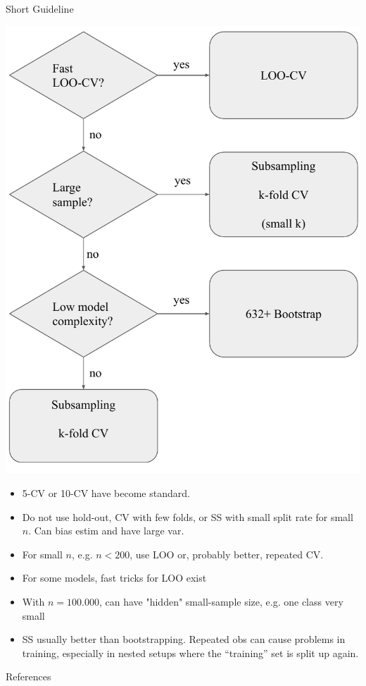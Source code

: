 \begin{vbframe}{Short Guideline}

\fboxsep=0pt
\noindent%
\begin{minipage}[t]{0.42\linewidth}
\vspace{0pt}
\includegraphics{figure_man/resampling_dec_tree}
\end{minipage}%
\hfill%
%
\begin{minipage}[t]{0.58\linewidth}
\vspace{0pt}
\footnotesize
\begin{itemize}
  \item 5-CV or 10-CV have become standard.
  \item Do not use hold-out, CV with few folds, or SS with small 
  split rate for small $n$. Can bias estim and have large var.
  \item For small $n$, e.g. $n < 200$, use 
  LOO or, probably better, repeated CV.
  \item For some models, fast tricks for LOO exist
  \item With $n = 100.000$, can have "hidden" small-sample size, e.g.
  one class very small
  \item SS usually better than bootstrapping. Repeated obs can cause problems in training,
    especially in nested setups where the \enquote{training} set is split up again.
\end{itemize}
\end{minipage}



\end{vbframe}

\begin{vbframe}{References}
\footnotesize
\nocite{*}


\end{vbframe}


\endlecture

